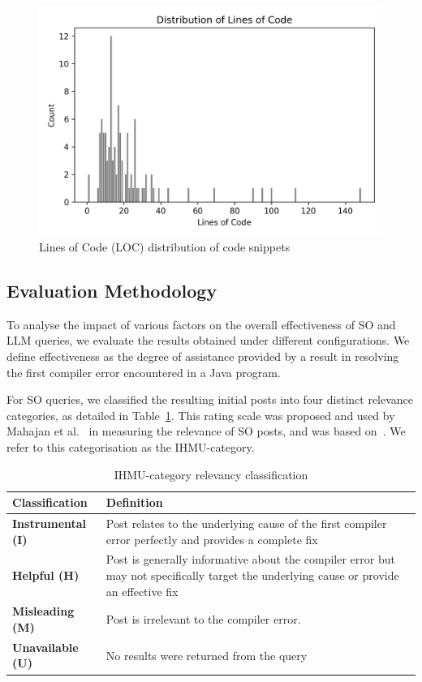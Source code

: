 \documentclass[preprint,12pt]{elsarticle}
\begin{document}
\begin{figure}[h]
\centering
\includegraphics[width=\linewidth]{Figures/loc_distribution.png}
\caption{Lines of Code (LOC) distribution of code snippets}
\label{fig: loc}
\end{figure}

\subsection{Evaluation Methodology}

To analyse the impact of various factors on the overall effectiveness of SO and LLM queries, we evaluate the results obtained under different configurations. We define effectiveness as the degree of assistance provided by a result in resolving the first compiler error encountered in a Java program.

For SO queries, we classified the resulting initial posts into four distinct relevance categories, as detailed in Table~\ref{table: ih table}. This rating scale was proposed and used by Mahajan et al.~\cite{r20} in measuring the relevance of SO posts, and was based on~\cite{o2,o20,o15}. We refer to this categorisation as the IHMU-category.

\renewcommand{\arraystretch}{1.1}
\begin{table}[ht]
    \centering
    \caption{IHMU-category relevancy classification}
    \label{table: ih table}
    \footnotesize
\begin{tabular}{m{3.6cm}m{9.2cm}}
\bottomrule
    \hline
\rowcolor{gray!20} 
\textbf{Classification} & \textbf{Definition}  \\
\hline
\textbf{Instrumental (I)}   & Post relates to the underlying cause of the first compiler error perfectly and provides a complete fix \\
 \hline
 \textbf{Helpful (H)} & Post is generally informative about the compiler error but may not specifically target the underlying cause or provide an effective fix  \\
 \hline
\textbf{Misleading (M)} &  Post is irrelevant to the compiler error. \\
 \hline
\textbf{Unavailable (U)} & No results were returned from the query   \\
 \bottomrule
  \hline
\end{tabular}
    
\end{table}
\end{document}
